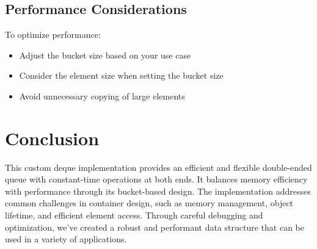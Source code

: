 \documentclass[a4paper,12pt]{article}
\begin{document}
\subsection{Performance Considerations}
To optimize performance:
\begin{itemize}
    \item Adjust the bucket size based on your use case
    \item Consider the element size when setting the bucket size
    \item Avoid unnecessary copying of large elements
\end{itemize}

\section{Conclusion}
This custom deque implementation provides an efficient and flexible double-ended queue with constant-time operations at both ends. It balances memory efficiency with performance through its bucket-based design. The implementation addresses common challenges in container design, such as memory management, object lifetime, and efficient element access. Through careful debugging and optimization, we've created a robust and performant data structure that can be used in a variety of applications.
\end{document}
